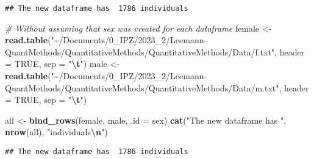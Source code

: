 \documentclass[
]{book}
\newenvironment{Shaded}{\begin{snugshade}}{\end{snugshade}}
\newcommand{\AttributeTok}[1]{\textcolor[rgb]{0.13,0.29,0.53}{#1}}
\newcommand{\CommentTok}[1]{\textcolor[rgb]{0.56,0.35,0.01}{\textit{#1}}}
\newcommand{\ConstantTok}[1]{\textcolor[rgb]{0.56,0.35,0.01}{#1}}
\newcommand{\DecValTok}[1]{\textcolor[rgb]{0.00,0.00,0.81}{#1}}
\newcommand{\FunctionTok}[1]{\textcolor[rgb]{0.13,0.29,0.53}{\textbf{#1}}}
\newcommand{\NormalTok}[1]{#1}
\newcommand{\OtherTok}[1]{\textcolor[rgb]{0.56,0.35,0.01}{#1}}
\newcommand{\SpecialCharTok}[1]{\textcolor[rgb]{0.81,0.36,0.00}{\textbf{#1}}}
\newcommand{\StringTok}[1]{\textcolor[rgb]{0.31,0.60,0.02}{#1}}
\begin{document}
\begin{verbatim}
## The new dataframe has  1786 individuals
\end{verbatim}

\begin{Shaded}
\begin{Highlighting}[]
\CommentTok{\# Without assuming that \textasciigrave{}sex\textasciigrave{} was created for each dataframe}
\NormalTok{female }\OtherTok{\textless{}{-}} \FunctionTok{read.table}\NormalTok{(}\StringTok{"\textasciitilde{}/Documents/0\_IPZ/2023\_2/Leemann{-}QuantMethods/QuantitativeMethods/QuantitativeMethods/Data/f.txt"}\NormalTok{, }\AttributeTok{header =} \ConstantTok{TRUE}\NormalTok{, }\AttributeTok{sep =} \StringTok{"}\SpecialCharTok{\textbackslash{}t}\StringTok{"}\NormalTok{)}
\NormalTok{male }\OtherTok{\textless{}{-}} \FunctionTok{read.table}\NormalTok{(}\StringTok{"\textasciitilde{}/Documents/0\_IPZ/2023\_2/Leemann{-}QuantMethods/QuantitativeMethods/QuantitativeMethods/Data/m.txt"}\NormalTok{, }\AttributeTok{header =} \ConstantTok{TRUE}\NormalTok{, }\AttributeTok{sep =} \StringTok{"}\SpecialCharTok{\textbackslash{}t}\StringTok{"}\NormalTok{)}

\NormalTok{all }\OtherTok{\textless{}{-}} \FunctionTok{bind\_rows}\NormalTok{(female, male, }\AttributeTok{.id =} \StringTok{\textquotesingle{}sex\textquotesingle{}}\NormalTok{)}
\FunctionTok{cat}\NormalTok{(}\StringTok{"The new dataframe has "}\NormalTok{, }\FunctionTok{nrow}\NormalTok{(all), }\StringTok{"individuals}\SpecialCharTok{\textbackslash{}n}\StringTok{"}\NormalTok{)}
\end{Highlighting}
\end{Shaded}

\begin{verbatim}
## The new dataframe has  1786 individuals
\end{verbatim}

\begin{Shaded}
\end{Shaded}
\end{document}
